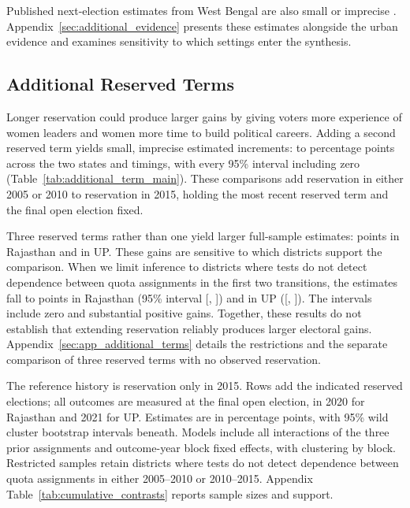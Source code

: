 \documentclass[11pt]{article}
\begin{document}
Published next-election estimates from West Bengal are also small or imprecise \citep{beaman2009powerful}. Appendix~\ref{sec:additional_evidence} presents these estimates alongside the urban evidence and examines sensitivity to which settings enter the synthesis.

\FloatBarrier
\subsection{Additional Reserved Terms}\label{sec:additional_terms}

Longer reservation could produce larger gains by giving voters more experience of women leaders and women more time to build political careers. Adding a second reserved term yields small, imprecise estimated increments: \twoTermExtraMin{} to \twoTermExtraMax{} percentage points across the two states and timings, with every 95\% interval including zero (Table~\ref{tab:additional_term_main}). These comparisons add reservation in either 2005 or 2010 to reservation in 2015, holding the most recent reserved term and the final open election fixed.

Three reserved terms rather than one yield larger full-sample estimates: \rajFullExtra{} points in Rajasthan and \upFullExtra{} in UP. These gains are sensitive to which districts support the comparison. When we limit inference to districts where tests do not detect dependence between quota assignments in the first two transitions, the estimates fall to \rajRestrictedExtra{} points in Rajasthan (95\% interval [\rajRestrictedExtraLow{}, \rajRestrictedExtraHigh{}]) and \upRestrictedExtra{} in UP ([\upRestrictedExtraLow{}, \upRestrictedExtraHigh{}]). The intervals include zero and substantial positive gains. Together, these results do not establish that extending reservation reliably produces larger electoral gains. Appendix~\ref{sec:app_additional_terms} details the restrictions and the separate comparison of three reserved terms with no observed reservation.

\begin{table}[!htbp]
    \centering
    \caption{Electoral Gains from Additional Reserved Terms}
    \label{tab:additional_term_main}
    \small
    
    \par\smallskip
    \begin{minipage}{\textwidth}\footnotesize
    The reference history is reservation only in 2015. Rows add the indicated reserved elections; all outcomes are measured at the final open election, in 2020 for Rajasthan and 2021 for UP. Estimates are in percentage points, with 95\% wild cluster bootstrap intervals beneath. Models include all interactions of the three prior assignments and outcome-year block fixed effects, with clustering by block. Restricted samples retain districts where tests do not detect dependence between quota assignments in either 2005--2010 or 2010--2015. Appendix Table~\ref{tab:cumulative_contrasts} reports sample sizes and support.
    \end{minipage}
\end{table}
\end{document}
